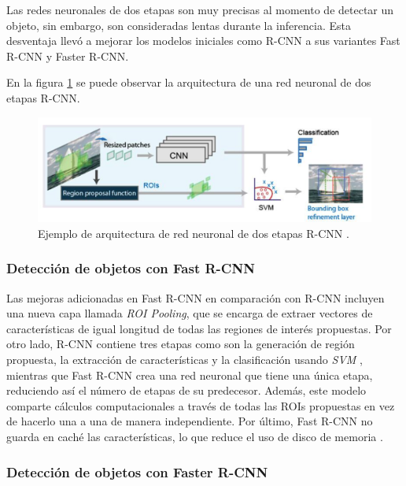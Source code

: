 Las redes neuronales de dos etapas son muy precisas al momento de detectar un objeto, sin embargo, son consideradas lentas durante la inferencia. Esta desventaja llevó a mejorar los modelos iniciales como R-CNN a sus variantes Fast R-CNN y Faster R-CNN.

En la figura \ref{fig:rcnn} se puede observar la arquitectura de una red neuronal de dos etapas R-CNN.

\begin{figure}[ht]
	\centering
	\includegraphics[scale=.25]{./Figures/R-CNN.png}
	\caption{Ejemplo de arquitectura de red neuronal de dos etapas R-CNN \protect\footnotemark.}
	\label{fig:rcnn}
\end{figure}


\subsubsection{Detección de objetos con Fast R-CNN}

Las mejoras adicionadas en Fast R-CNN en comparación con R-CNN incluyen una nueva capa llamada \textit{ROI Pooling}, que se encarga de extraer vectores de características de igual longitud de todas las regiones de interés propuestas. Por otro lado, R-CNN contiene tres etapas como son la generación de región propuesta, la extracción de características y la clasificación usando \textit{SVM} \cite{ARTICLE:19}, mientras que Fast R-CNN crea una red neuronal que tiene una única etapa, reduciendo así el número de etapas de su predecesor. Además, este modelo comparte cálculos computacionales a través de todas las ROIs propuestas en vez de hacerlo una a una de manera independiente. Por último, Fast R-CNN no guarda en caché las características, lo que reduce el uso de disco de memoria \cite{ARTICLE:10}.

\subsubsection{Detección de objetos con Faster R-CNN}

